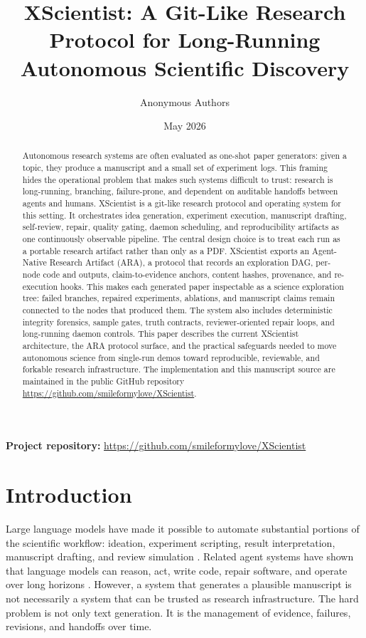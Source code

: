 \documentclass[11pt]{article}
\title{XScientist: A Git-Like Research Protocol for Long-Running Autonomous Scientific Discovery}
\author{
Anonymous Authors
}
\date{May 2026}
\begin{document}
\maketitle

\begin{center}
\textbf{Project repository:} \url{https://github.com/smileformylove/XScientist}
\end{center}

\begin{abstract}
Autonomous research systems are often evaluated as one-shot paper generators:
given a topic, they produce a manuscript and a small set of experiment logs.
This framing hides the operational problem that makes such systems difficult
to trust: research is long-running, branching, failure-prone, and dependent on
auditable handoffs between agents and humans. XScientist is a git-like
research protocol and operating system for this setting. It orchestrates idea
generation, experiment execution, manuscript drafting, self-review, repair,
quality gating, daemon scheduling, and reproducibility artifacts as one
continuously observable pipeline. The central design choice is to treat each
run as a portable research artifact rather than only as a PDF. XScientist
exports an Agent-Native Research Artifact (ARA), a protocol that records an
exploration DAG, per-node code and outputs, claim-to-evidence anchors,
content hashes, provenance, and re-execution hooks. This makes each generated
paper inspectable as a science exploration tree: failed branches, repaired
experiments, ablations, and manuscript claims remain connected to the nodes
that produced them. The system also includes deterministic integrity
forensics, sample gates, truth contracts, reviewer-oriented repair loops, and
long-running daemon controls. This paper describes the current XScientist
architecture, the ARA protocol surface, and the practical safeguards needed
to move autonomous science from single-run demos toward reproducible,
reviewable, and forkable research infrastructure. The implementation and this
manuscript source are maintained in the public GitHub repository
\url{https://github.com/smileformylove/XScientist}.
\end{abstract}

\section{Introduction}

Large language models have made it possible to automate substantial portions
of the scientific workflow: ideation, experiment scripting, result
interpretation, manuscript drafting, and review simulation
\cite{ai-scientist,ai-scientist-v2}. Related agent systems have shown that
language models can reason, act, write code, repair software, and operate
over long horizons \cite{react,reflexion,tree-of-thoughts,swe-agent,voyager}.
However, a system that generates a plausible manuscript is not necessarily a
system that can be trusted as research infrastructure. The hard problem is
not only text generation. It is the management of evidence, failures,
revisions, and handoffs over time.
\end{document}
